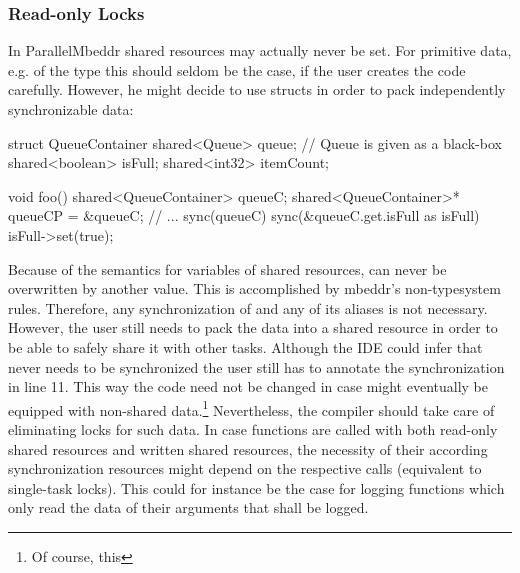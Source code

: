 \subsubsection{Read-only Locks}
In ParallelMbeddr shared resources may actually never be set. For primitive data, e.g. of the type  this should seldom be the case, if the user creates the code carefully. However, he might decide to use structs in order to pack independently synchronizable data:
\begin{ccode}
struct QueueContainer {
  shared<Queue>   queue;     // Queue is given as a black-box
  shared<boolean> isFull;
  shared<int32>   itemCount;
}

void foo() {
  shared<QueueContainer> queueC;
  shared<QueueContainer>* queueCP = &queueC;
  // ...
  sync(queueC) {
    sync(&queueC.get.isFull as isFull) {
      isFull->set(true);
    }
  }
}
\end{ccode}
Because of the semantics for variables of shared resources,  can never be overwritten by another value. This is accomplished by mbeddr's non-typesystem rules. Therefore, any synchronization of  and any of its aliases is not necessary. However, the user still needs to pack the data into a shared resource in order to be able to safely share it with other tasks. Although the IDE could infer that  never needs to be synchronized the user still has to annotate the synchronization in line 11. This way the code need not be changed in case  might eventually be equipped with non-shared data.\footnote{Of course, this } Nevertheless, the compiler should take care of eliminating locks for such data. In case functions are called with both read-only shared resources and written shared resources, the necessity of their according synchronization resources might depend on the respective calls (equivalent to single-task locks). This could for instance be the case for logging functions which only read the data of their arguments that shall be logged.

